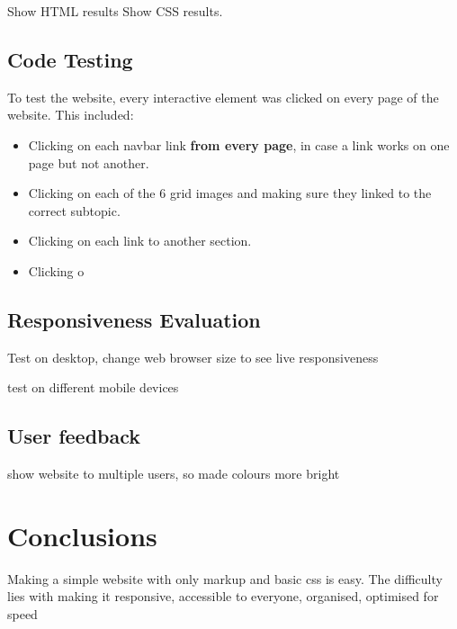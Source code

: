 \documentclass[letterpaper,12pt]{article}
\begin{document}
Show HTML results
Show CSS results.

\subsection{Code Testing}

To test the website, every interactive element was clicked on every page of the website. This included:
\begin{itemize}
    \item Clicking on each navbar link \textbf{from every page}, in case a link works on one page but not another.
    \item Clicking on each of the 6 grid images and making sure they linked to the correct subtopic.
    \item Clicking on each link to another section.
    \item Clicking o
\end{itemize}

\subsection{Responsiveness Evaluation}

Test on desktop, change web browser size to see live responsiveness

test on different mobile devices

\subsection{User feedback}

show website to multiple users, so made colours more bright

\section{Conclusions}
\label{sec:conclusions}

Making a simple website with only markup and basic css is easy. The difficulty lies with making it responsive, accessible to everyone, organised, optimised for speed

\end{document}

